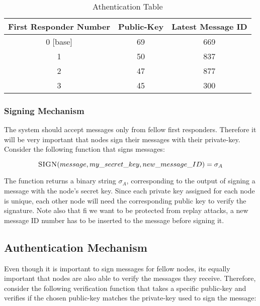 \documentclass[letterpaper]{article}
\begin{document}
\begin{table}[ht]
\caption{Athentication Table} %
\centering %
\begin{tabular}{c c c } %
\hline
\hline %
First Responder Number & Public-Key & Latest Message ID  \\[0.5ex] %
\hline %
0 [base] & 69 & 669\\
1 & 50 & 837\\
2 & 47 & 877 \\
3 & 45 & 300\\ [1ex]
\hline
\end{tabular}
\label{table:nonlin}
\end{table}

\subsubsection{Signing Mechanism}

The system should accept messages only from fellow first responders. 
Therefore it will be very important that nodes sign their messages with their private-key. 
Consider the following function that signs messages:

$$\textsc{SIGN}(message, my\_secret\_key, new\_message\_ID) = \sigma_{A}$$

The function returns a binary string $\sigma_{A}$, corresponding to the output of signing a message with the node's secret key. Since each private key assigned for each node is unique, each other node will need the corresponding public key to verify the signature. Note also that fi we want to be protected from replay attacks, a new message ID number has to be inserted to the message before signing it.

\subsection{Authentication Mechanism}
Even though it is important to sign messages for fellow nodes, its equally important that nodes are also able to verify the messages they receive. 
Therefore, consider the following verification function that takes a specific public-key and verifies if the chosen public-key matches the private-key used to sign the message:
\end{document}
